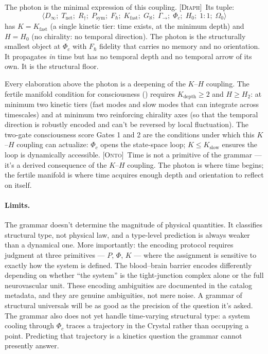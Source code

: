 \documentclass[12pt,a4paper]{article}
\newcommand{\Phic}{\Phi_c}
\newcommand{\GamSeq}{\Gamma_{\to}}
\newcommand{\DIAPH}{\textsc{[Diaph]}}
\newcommand{\ONTO}{\textsc{[Onto]}}
\begin{document}
The photon is the minimal expression of this coupling. \DIAPH\
Its tuple:
\begin{equation}
  \langle D_\infty;\; T_\text{net};\; R_\dagger;\; P_\text{sym};\;
  F_\hbar;\; K_\text{fast};\; G_\aleph;\; \GamSeq;\; \Phic;\; H_0;\;
  1{:}1;\; \Omega_0 \rangle
  \label{eq:photon}
\end{equation}
has $K = K_\text{fast}$ (a single kinetic tier: time exists, at the
minimum depth) and $H = H_0$ (no chirality: no temporal direction).
The photon is the structurally smallest object at $\Phic$ with
$F_\hbar$ fidelity that carries no memory and no orientation. It
propagates \emph{in} time but has no temporal depth and no temporal
arrow of its own. It is the structural floor.

Every elaboration above the photon is a deepening of the $K$--$H$
coupling. The fertile manifold condition for consciousness
() requires $K_\text{depth} \geq 2$ and
$H \geq H_2$: at minimum two kinetic tiers (fast modes and slow
modes that can integrate across timescales) and at minimum two
reinforcing chirality axes (so that the temporal direction is
robustly encoded and can't be reversed by local fluctuation). The
two-gate consciousness score Gates 1 and 2 are the conditions under
which this $K$--$H$ coupling can actualize: $\Phic$ opens the
state-space loop; $K \leq K_\text{slow}$ ensures the loop is
dynamically accessible. \ONTO\ Time is not a primitive of the grammar
--- it's a derived consequence of the $K$--$H$ coupling. The photon
is where time begins; the fertile manifold is where time acquires
enough depth and orientation to reflect on itself.

\paragraph{Limits.}
The grammar doesn't determine the magnitude of physical quantities.
It classifies structural type, not physical law, and a type-level
prediction is always weaker than a dynamical one. More importantly:
the encoding protocol requires judgment at three primitives --- $P$,
$\Phi$, $K$ --- where the assignment is sensitive to exactly how the
system is defined. The blood--brain barrier encodes differently
depending on whether ``the system'' is the tight-junction complex
alone or the full neurovascular unit. These encoding ambiguities are
documented in the catalog metadata, and they are genuine ambiguities,
not mere noise. A grammar of structural universals will be as good
as the precision of the question it's asked. The grammar also does
not yet handle time-varying structural type: a system cooling through
$\Phic$ traces a trajectory in the Crystal rather than occupying a
point. Predicting that trajectory is a kinetics question the grammar
cannot presently answer.
\end{document}
